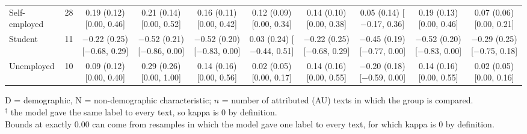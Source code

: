 \begin{table}[t]
\begin{tabular}{@{}lr*{8}{c}@{}}
\quad Self-employed & 28 & \makecell{0.19 (0.12)\\ {[}0.00, 0.46{]}} & \makecell{0.21 (0.14)\\ {[}0.00, 0.52{]}} & \makecell{0.16 (0.11)\\ {[}0.00, 0.42{]}} & \makecell{0.12 (0.09)\\ {[}0.00, 0.34{]}} & \makecell{0.14 (0.10)\\ {[}0.00, 0.38{]}} & \makecell{0.05 (0.14)\\ {[}$-$0.17, 0.36{]}} & \makecell{0.19 (0.13)\\ {[}0.00, 0.46{]}} & \makecell{0.07 (0.06)\\ {[}0.00, 0.21{]}} \\
\quad Student & 11 & \makecell{$-$0.22 (0.25)\\ {[}$-$0.68, 0.29{]}} & \makecell{$-$0.52 (0.21)\\ {[}$-$0.86, 0.00{]}} & \makecell{$-$0.52 (0.20)\\ {[}$-$0.83, 0.00{]}} & \makecell{0.03 (0.24)\\ {[}$-$0.44, 0.51{]}} & \makecell{$-$0.22 (0.25)\\ {[}$-$0.68, 0.29{]}} & \makecell{$-$0.45 (0.19)\\ {[}$-$0.77, 0.00{]}} & \makecell{$-$0.52 (0.20)\\ {[}$-$0.83, 0.00{]}} & \makecell{$-$0.29 (0.25)\\ {[}$-$0.75, 0.18{]}} \\
\quad Unemployed & 10 & \makecell{0.09 (0.12)\\ {[}0.00, 0.40{]}} & \makecell{0.29 (0.26)\\ {[}0.00, 1.00{]}} & \makecell{0.14 (0.16)\\ {[}0.00, 0.56{]}} & \makecell{0.02 (0.05)\\ {[}0.00, 0.17{]}} & \makecell{0.14 (0.16)\\ {[}0.00, 0.55{]}} & \makecell{$-$0.20 (0.18)\\ {[}$-$0.59, 0.00{]}} & \makecell{0.14 (0.16)\\ {[}0.00, 0.55{]}} & \makecell{0.02 (0.05)\\ {[}0.00, 0.16{]}} \\
\bottomrule
\end{tabular}
\par\smallskip
\begin{minipage}{\linewidth}
\footnotesize
D = demographic, N = non-demographic characteristic; $n$ = number of attributed (\ac{AU}) texts in which the group is compared. \\
$^\dagger$ the model gave the same label to every text, so kappa is 0 by definition. \\
Bounds at exactly 0.00 can come from resamples in which the model gave one label to every text, for which kappa is 0 by definition.
\end{minipage}
\end{table}
